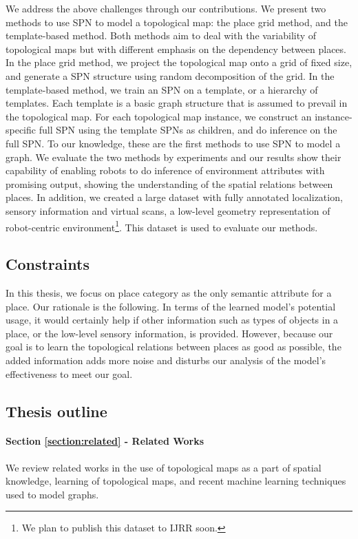 \documentclass[10pt, titlepage]{article}
\theoremstyle{definition}
\begin{document}
We address the above challenges through our contributions. We present two methods to use SPN to model a topological map: the place grid method, and the template-based method. Both methods aim to deal with the variability of topological maps but with different emphasis on the dependency between places. In the place grid method, we project the topological map onto a grid of fixed size, and generate a SPN structure using random decomposition of the grid. In the template-based method, we train an SPN on a template, or a hierarchy of templates. Each template is a basic graph structure that is assumed to prevail in the topological map. For each topological map instance, we construct an instance-specific full SPN using the template SPNs as children, and do inference on the full SPN. To our knowledge, these are the first methods to use SPN to model a graph. We evaluate the two methods by experiments and our results show their capability of enabling robots to do inference of environment attributes with promising output, showing the understanding of the spatial relations between places. In addition, we created a large dataset with fully annotated localization, sensory information and virtual scans, a low-level geometry representation of robot-centric environment\footnote{We plan to publish this dataset to IJRR soon.}. This dataset is used to evaluate our methods.

\subsection{Constraints}
In this thesis, we focus on place category as the only semantic attribute for a place. Our rationale is the following. In terms of the learned model's potential usage, it would certainly help if other information such as types of objects in a place, or the low-level sensory information, is provided. However, because our goal is to learn the topological relations between places as good as possible, the added information adds more noise and disturbs our analysis of the model's effectiveness to meet our goal.


\subsection{Thesis outline}

\paragraph{Section \ref{section:related} - Related Works} We review related works in the use of topological maps as a part of spatial knowledge, learning of topological maps, and recent machine learning techniques used to model graphs.
\end{document}
